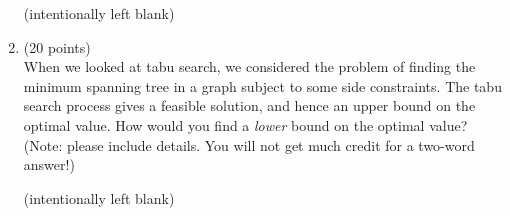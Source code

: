 \documentclass[12pt]{article}
\begin{document}
\begin{enumerate}
\addtocounter{page}{-1}
(intentionally left blank)

\pagebreak

\item (20 points) \\
When we looked at tabu search, we considered the problem of finding
the minimum spanning tree in a graph subject to some side constraints.
The tabu search process gives a feasible solution, and hence an upper bound
on the optimal value.
How would you find a {\em lower} bound on the optimal value?
(Note: please include details. You will not get much credit for
a two-word answer!)

\pagebreak

\addtocounter{page}{-1}
(intentionally left blank)



\end{enumerate}
\end{document}
